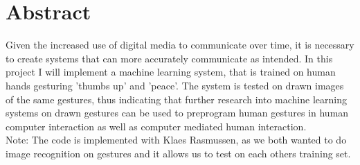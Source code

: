 \documentclass[10pt, a4paper]{article}
\begin{document}
\section{Abstract}
Given the increased use of digital media to communicate over time, it is necessary to create systems that can more accurately communicate as intended. In this project I will implement a machine learning system, that is trained on human hands gesturing 'thumbs up' and 'peace'. The system is tested on drawn images of the same gestures, thus indicating that further research into machine learning systems on drawn gestures can be used to preprogram human gestures in human computer interaction as well as computer mediated human interaction.\\

Note: The code is implemented with Klaes Rasmussen, as we both wanted to do image recognition on gestures and it allows us to test on each others training set.


\nocite{*}
\end{document}
